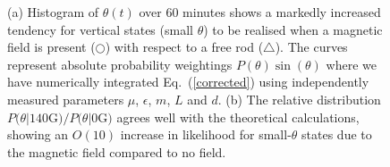 \documentclass[aps,prl,twocolumn,superscriptaddress]{revtex4-1}
\begin{document}
\begin{figure}
\centering
    \caption{\footnotesize (a) Histogram of $\theta(t)$ over 60 minutes shows a markedly increased tendency for vertical states (small $\theta$) to be realised when a magnetic field is present ({\color{NavyBlue}$\bigcirc$}) with respect to a free rod ({\color{red}$\bigtriangleup$}). The curves represent absolute probability weightings $P(\theta) \sin(\theta)$ where we have numerically integrated Eq.\ (\ref{corrected}) using independently measured parameters $\mu$, $\epsilon$, $m$, $L$ and $d$. (b) The relative distribution $P(\theta | 140 $G$)/P(\theta | 0 $G$)$ agrees well with the theoretical calculations, showing an $O(10)$ increase in likelihood for small-$\theta$ states due to the magnetic field compared to no field.}
\end{figure}
\end{document}
